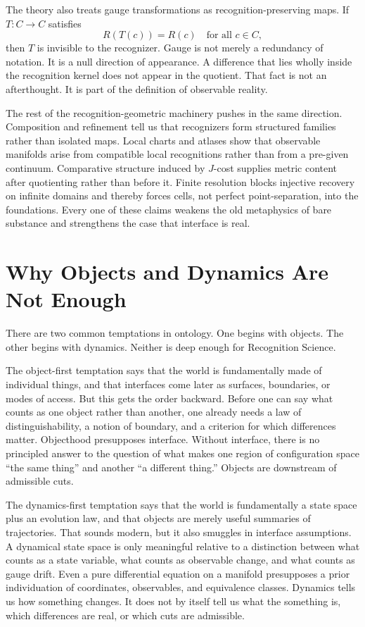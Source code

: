 \documentclass[11pt]{article}
\begin{document}
The theory also treats gauge transformations as recognition-preserving maps.
If $T : C \to C$ satisfies
\[
R(T(c)) = R(c)
\quad \text{for all } c \in C,
\]
then $T$ is invisible to the recognizer.
Gauge is not merely a redundancy of notation.
It is a null direction of appearance.
A difference that lies wholly inside the recognition kernel does not appear in the quotient.
That fact is not an afterthought.
It is part of the definition of observable reality.

The rest of the recognition-geometric machinery pushes in the same direction.
Composition and refinement tell us that recognizers form structured families rather than isolated maps.
Local charts and atlases show that observable manifolds arise from compatible local recognitions rather than from a pre-given continuum.
Comparative structure induced by $J$-cost supplies metric content after quotienting rather than before it.
Finite resolution blocks injective recovery on infinite domains and thereby forces cells, not perfect point-separation, into the foundations.
Every one of these claims weakens the old metaphysics of bare substance and strengthens the case that interface is real.

\section{Why Objects and Dynamics Are Not Enough}

There are two common temptations in ontology.
One begins with objects.
The other begins with dynamics.
Neither is deep enough for Recognition Science.

The object-first temptation says that the world is fundamentally made of individual things, and that interfaces come later as surfaces, boundaries, or modes of access.
But this gets the order backward.
Before one can say what counts as one object rather than another, one already needs a law of distinguishability, a notion of boundary, and a criterion for which differences matter.
Objecthood presupposes interface.
Without interface, there is no principled answer to the question of what makes one region of configuration space ``the same thing'' and another ``a different thing.''
Objects are downstream of admissible cuts.

The dynamics-first temptation says that the world is fundamentally a state space plus an evolution law, and that objects are merely useful summaries of trajectories.
That sounds modern, but it also smuggles in interface assumptions.
A dynamical state space is only meaningful relative to a distinction between what counts as a state variable, what counts as observable change, and what counts as gauge drift.
Even a pure differential equation on a manifold presupposes a prior individuation of coordinates, observables, and equivalence classes.
Dynamics tells us how something changes.
It does not by itself tell us what the something is, which differences are real, or which cuts are admissible.
\end{document}
